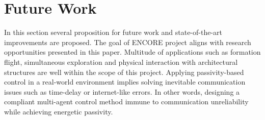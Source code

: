 \section{Future Work} \label{future_work}
In this section several proposition for future work and state-of-the-art improvements are proposed. The goal of ENCORE \cite{ENCOREweb} project aligns with research opportunities presented in this paper. Multitude of applications such as formation flight, simultaneous exploration and physical interaction with architectural structures are well within the scope of this project. Applying passivity-based control in a real-world environment implies solving inevitable communication issues such as time-delay or internet-like errors. In other words, designing a compliant multi-agent control method immune to communication unreliability while achieving energetic passivity.